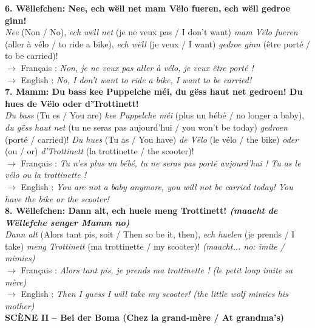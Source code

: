 \noindent\textbf{6. Wëllefchen: Nee, ech wëll net mam Vëlo fueren, ech wëll gedroe ginn!}\\
\textit{Nee} (Non / No), \textit{ech wëll net} (je ne veux pas / I don't want) \textit{mam Vëlo fueren} (aller à vélo / to ride a bike), \textit{ech wëll} (je veux / I want) \textit{gedroe ginn} (être porté / to be carried)!\\
$\rightarrow$ Français : \textit{Non, je ne veux pas aller à vélo, je veux être porté !}\\
$\rightarrow$ English : \textit{No, I don't want to ride a bike, I want to be carried!}\\[0.5em]

\noindent\textbf{7. Mamm: Du bass kee Puppelche méi, du gëss haut net gedroen! Du hues de Vëlo oder d'Trottinett!}\\
\textit{Du bass} (Tu es / You are) \textit{kee Puppelche méi} (plus un bébé / no longer a baby), \textit{du gëss haut net} (tu ne seras pas aujourd'hui / you won't be today) \textit{gedroen} (porté / carried)! \textit{Du hues} (Tu as / You have) \textit{de Vëlo} (le vélo / the bike) \textit{oder} (ou / or) \textit{d'Trottinett} (la trottinette / the scooter)!\\
$\rightarrow$ Français : \textit{Tu n'es plus un bébé, tu ne seras pas porté aujourd'hui ! Tu as le vélo ou la trottinette !}\\
$\rightarrow$ English : \textit{You are not a baby anymore, you will not be carried today! You have the bike or the scooter!}\\[0.5em]

\noindent\textbf{8. Wëllefchen: Dann alt, ech huele meng Trottinett! \textit{(maacht de Wëllefche senger Mamm no)}}\\
\textit{Dann alt} (Alors tant pis, soit / Then so be it, then), \textit{ech huelen} (je prends / I take) \textit{meng Trottinett} (ma trottinette / my scooter)! \textit{(maacht... no: imite / mimics)}\\
$\rightarrow$ Français : \textit{Alors tant pis, je prends ma trottinette ! (le petit loup imite sa mère)}\\
$\rightarrow$ English : \textit{Then I guess I will take my scooter! (the little wolf mimics his mother)} \\[0.5em]

\noindent\textbf{SCÈNE II -- Bei der Boma (Chez la grand-mère / At grandma's)}

